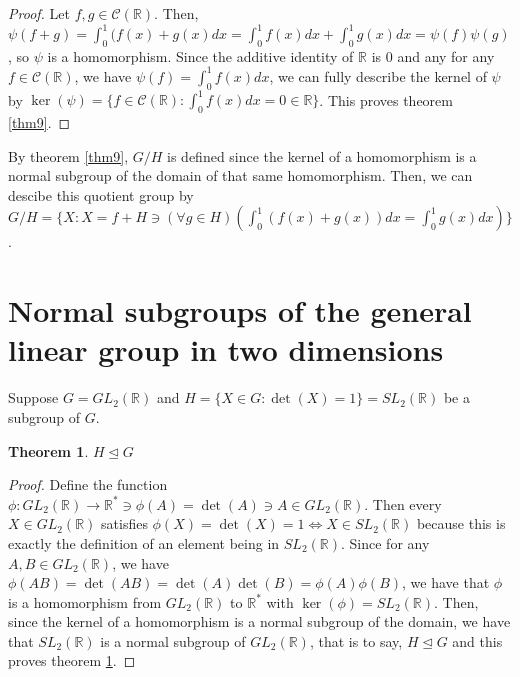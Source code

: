 \documentclass[12pt]{article}
\newcommand{\reals}{\mathbb{R}}
\newcommand{\gltwo}{GL_2(\reals)}
\newcommand{\sltwo}{SL_2(\reals)}
\newcommand{\creals}{\mathcal{C}(\reals)}
\newtheorem{thm}{Theorem}
\begin{document}
\begin{proof}
	Let $f,g \in \creals$.
	Then, $\psi(f + g) = \int_0^1 (f(x) + g(x)dx = \int_0^1 f(x)dx + \int_0^1 g(x)dx = \psi(f) \psi(g)$,
	so $\psi$ is a homomorphism.
	Since the additive identity of $\reals$ is $0$ and any for any $f \in \creals$,
	we have $\psi(f) = \int_0^1 f(x)dx$, we can fully describe the kernel of $\psi$
	by $\ker(\psi) = \{ f \in \creals : \int_0^1 f(x)dx = 0 \in \reals \}$.
	This proves theorem \ref{thm9}.
\end{proof}

By theorem \ref{thm9},
$G/H$ is defined since the kernel of a homomorphism
is a normal subgroup of the domain of that same homomorphism.
Then, we can descibe this quotient group
by $G/H = \{X: X = f + H \ni (\forall g \in H)(\int_0^1 (f(x) + g(x))dx = \int_0^1 g(x)dx) \}$.

\section{Normal subgroups of the general linear group in two dimensions}

Suppose $G = \gltwo$ and $H = \{ X \in G: \det(X) = 1 \} = \sltwo$ be a subgroup of $G$.

\begin{thm} \label{thm10}
	$H \trianglelefteq G$
\end{thm}

\begin{proof}
	Define the function $\phi: \gltwo \to \reals^* \ni \phi(A) = \det(A) \ni A \in \gltwo$.
	Then every $X \in \gltwo$ satisfies $\phi(X) = \det(X) = 1 \iff X \in \sltwo$
	because this is exactly the definition of an element being in $\sltwo$.
	Since for any $A,B \in \gltwo$, we have $\phi(AB) = \det(AB) = \det(A)\det(B) = \phi(A)\phi(B)$,
	we have that $\phi$ is a homomorphism from $\gltwo$ to $\reals^*$
	with $\ker(\phi) = \sltwo$.
	Then, since the kernel of a homomorphism is a normal subgroup of the domain,
	we have that $\sltwo$ is a normal subgroup of $\gltwo$,
	that is to say, $H \trianglelefteq G$ and this proves theorem \ref{thm10}.
\end{proof}

\end{document}
